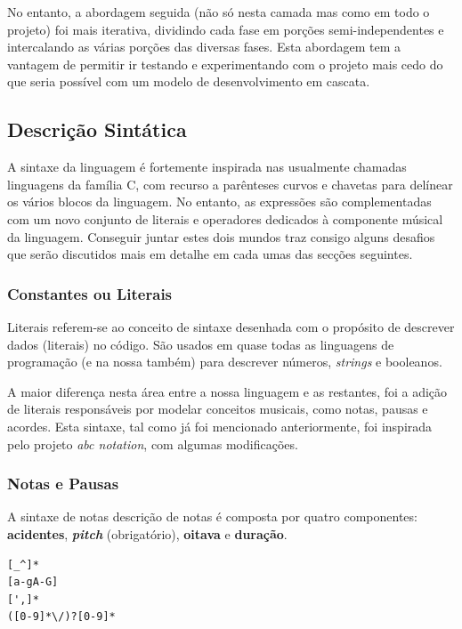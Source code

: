 No entanto, a abordagem seguida (não só nesta camada mas como em todo o projeto) foi mais iterativa, dividindo cada fase em porções semi-independentes e intercalando as várias porções das diversas fases. Esta abordagem tem a vantagem de permitir ir testando e experimentando com o projeto mais cedo do que seria possível com um modelo de desenvolvimento em cascata.

\subsection{Descrição Sintática}
A sintaxe da linguagem é fortemente inspirada nas usualmente chamadas linguagens da família C, com recurso a parênteses curvos e chavetas para delínear os vários blocos da linguagem. No entanto, as expressões são complementadas com um novo conjunto de literais e operadores dedicados à componente músical da linguagem. Conseguir juntar estes dois mundos traz consigo alguns desafios que serão discutidos mais em detalhe em cada umas das secções seguintes.

\subsubsection{\textbf{Constantes ou Literais}}
Literais referem-se ao conceito de sintaxe desenhada com o propósito de descrever dados (literais) no código. São usados em quase todas as linguagens de programação (e na nossa também) para descrever números, \textit{strings} e booleanos.

A maior diferença nesta área entre a nossa linguagem e as restantes, foi a adição de literais responsáveis por modelar conceitos musicais, como notas, pausas e acordes. Esta sintaxe, tal como já foi mencionado anteriormente, foi inspirada pelo projeto \textit{abc notation}, com algumas modificações.

\subsubsection{\textbf{Notas e Pausas}}
A sintaxe de notas descrição de notas é composta por quatro componentes: \textbf{acidentes}, \textbf{\textit{pitch}} (obrigatório), \textbf{oitava} e \textbf{duração}.

\begin{lstlisting}[caption=Expressão Regular que identifica uma nota (quebras de linha adicionadas apenas para claridade de leitura)]
[_^]*
[a-gA-G]
[',]*
([0-9]*\/)?[0-9]*
\end{lstlisting}


